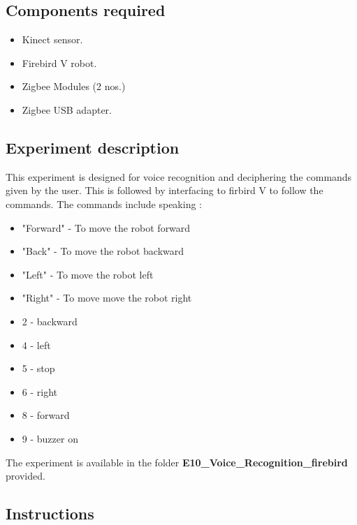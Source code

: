 \begin{flushleft}
\subsection{\textbf{ Components required}}
\begin{itemize}
\item Kinect sensor.
\item Firebird V robot.
\item Zigbee Modules (2 nos.)
\item Zigbee USB adapter.
\end{itemize}

\medskip
\subsection{\textbf{ Experiment description}}
 This experiment is designed for voice recognition and deciphering the commands given by the user. This is followed by interfacing to firbird V to follow the commands.
  The commands include speaking :
  \begin{itemize}
  
 \item "Forward" - To move the robot forward
 \item "Back"    - To move the robot backward
 \item "Left"    - To move the robot left
 \item "Right"   - To move move the robot right 
   \end{itemize} 
\begin{itemize}

 \item 2 - backward
 \item 4 - left
 \item 5 - stop
 \item 6 - right
 \item 8 - forward
 \item 9 - buzzer on
 \end{itemize}
\medskip
The experiment is available in the folder \textbf{E10\_Voice\_Recognition\_firebird} provided.
\medskip

\subsection{\textbf{ Instructions}}
\begin{enumerate}


\end{enumerate}
\end{flushleft}
